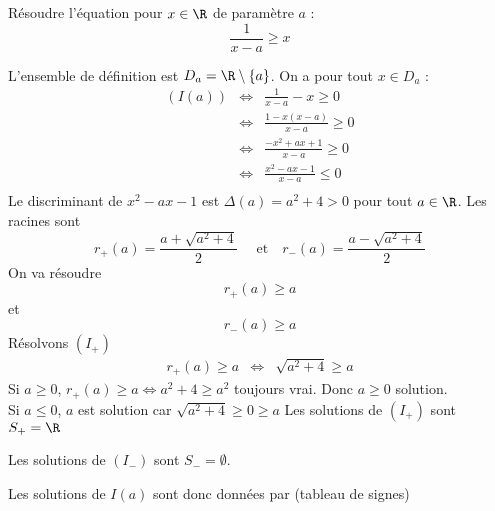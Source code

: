 


\begin{exercice}
Résoudre l'équation pour $x\in \R$ de paramètre $a$  : 
$$\frac{1}{x-a} \geq x$$
\end{exercice}

\begin{correction}
L'ensemble de définition est $D_a= \R\setminus \{ a\}$. 
On a pour tout $x\in D_a$ : 
\begin{eqnarray*}
(I(a))  &\Longleftrightarrow &\frac{1}{x-a}  -x  \geq 0\\
	&\Longleftrightarrow &\frac{1-x(x-a)}{x-a}  \geq 0\\
	&\Longleftrightarrow &\frac{- x^2 + ax+1}{x-a}  \geq 0\\
	&\Longleftrightarrow &\frac{x^2-ax-1}{x-a}  \leq 0 \\
\end{eqnarray*}
Le discriminant de $x^2-ax-1$ est $\Delta(a) = a^2+4>0$ pour tout $a\in \R$. 
Les racines sont 
$$r_+ (a) = \frac{a+\sqrt{a^2+4}}{2} \quad \text{ et} \quad r_- (a) = \frac{a-\sqrt{a^2+4}}{2} $$
On va résoudre
\begin{equation}\tag{$I_+$}
r_+(a) \geq a 
\end{equation} 
 et 
\begin{equation}\tag{$I_-$}
r_-(a) \geq a
\end{equation} 
Résolvons $(I_+)$
\begin{eqnarray}
r_+(a) \geq a &\Longleftrightarrow & \sqrt{a^2+4} \geq a
\end{eqnarray}
Si $a\geq 0$, $ r_+(a) \geq a \Longleftrightarrow  a^2+4 \geq a^2$ toujours vrai. Donc $a\geq 0 $ solution. \\
Si $a\leq 0$, $a$ est solution car $ \sqrt{a^2+4} \geq 0\geq a$
Les solutions de $(I_+)$ sont $S_+=\R$


Les solutions de $(I_-)$ sont $S_-=\emptyset$.


Les solutions de $I(a)$ sont donc données par (tableau de signes)
\conclusion{$]-\infty, r_-(a)]\cup ]a, r_+(a)]$)}

\end{correction}